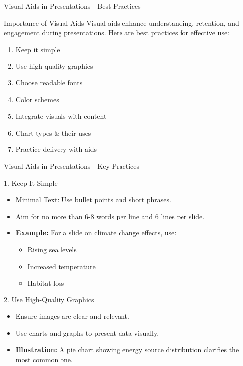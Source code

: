 \documentclass[aspectratio=169]{beamer}
\begin{document}
\begin{frame}[fragile]{Visual Aids in Presentations - Best Practices}
    \begin{block}{Importance of Visual Aids}
        Visual aids enhance understanding, retention, and engagement during presentations. Here are best practices for effective use:
    \end{block}

    \begin{enumerate}
        \item Keep it simple
        \item Use high-quality graphics
        \item Choose readable fonts
        \item Color schemes
        \item Integrate visuals with content
        \item Chart types & their uses
        \item Practice delivery with aids
    \end{enumerate}
\end{frame}

\begin{frame}[fragile]{Visual Aids in Presentations - Key Practices}
    \begin{block}{1. Keep It Simple}
        \begin{itemize}
            \item Minimal Text: Use bullet points and short phrases.
            \item Aim for no more than 6-8 words per line and 6 lines per slide.
            \item \textbf{Example:} For a slide on climate change effects, use:
            \begin{itemize}
                \item Rising sea levels
                \item Increased temperature
                \item Habitat loss
            \end{itemize}
        \end{itemize}
    \end{block}

    \begin{block}{2. Use High-Quality Graphics}
        \begin{itemize}
            \item Ensure images are clear and relevant.
            \item Use charts and graphs to present data visually.
            \item \textbf{Illustration:} A pie chart showing energy source distribution clarifies the most common one.
        \end{itemize}
    \end{block}
\end{frame}
\end{document}

